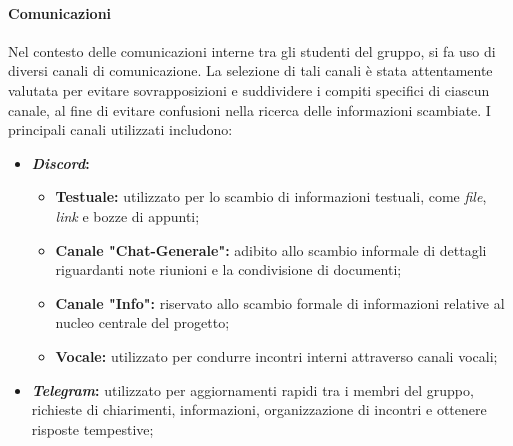 \documentclass[5pt]{article}
\begin{document}
\paragraph{Comunicazioni}
Nel contesto delle comunicazioni interne tra gli studenti del gruppo, si fa uso di diversi canali di comunicazione. La selezione di tali canali è stata attentamente valutata per evitare sovrapposizioni e suddividere i compiti specifici di ciascun canale, al fine di evitare confusioni nella ricerca delle informazioni scambiate. I principali canali utilizzati includono:
\begin{itemize}
    \item \textbf{\textit{Discord}:}
        \begin{itemize}
            \item \textbf{Testuale:} utilizzato per lo scambio di informazioni testuali, come \textit{file}, \textit{link} e bozze di appunti;
            \item \textbf{Canale "Chat-Generale":} adibito allo scambio informale di dettagli riguardanti note riunioni e la condivisione di documenti;
            \item \textbf{Canale "Info":} riservato allo scambio formale di informazioni relative al nucleo centrale del progetto;
            \item \textbf{Vocale:} utilizzato per condurre incontri interni attraverso canali vocali;
        \end{itemize}
    \item \textbf{\textit{Telegram}:} utilizzato per aggiornamenti rapidi tra i membri del gruppo, richieste di chiarimenti, informazioni, organizzazione di incontri e ottenere risposte tempestive;
\end{itemize}
\end{document}
